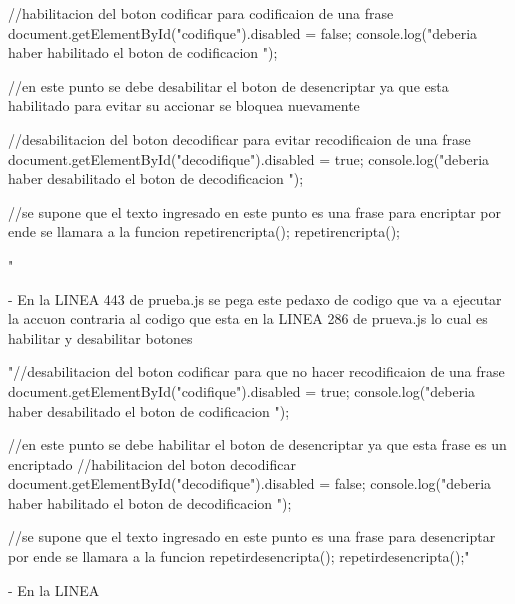 {{                                //habilitacion del boton codificar para codificaion de una frase 
                                document.getElementById("codifique").disabled = false;
                                console.log("deberia haber habilitado el boton de codificacion ");

                                //en este punto se debe desabilitar el boton de desencriptar ya que esta habilitado para evitar su accionar se bloquea nuevamente
                                
                                //desabilitacion del boton decodificar para evitar recodificaion de una frase 
                                document.getElementById("decodifique").disabled = true;
                                console.log("deberia haber desabilitado el boton de decodificacion ");  
                            
                            
                                //se supone que el texto ingresado en este punto es una frase para encriptar por ende se llamara a la funcion repetirencripta();
                                repetirencripta();
                            }
                        } "

            - En la LINEA 443 de prueba.js se pega este pedaxo de codigo que va a ejecutar la accuon contraria al codigo que esta en la LINEA 286 de prueva.js lo cual es habilitar y desabilitar botones 
                            
                                "//desabilitacion del boton codificar para que no hacer recodificaion de una frase 
                                document.getElementById("codifique").disabled = true;
                                console.log("deberia haber desabilitado el boton de codificacion ");

                                //en este punto se debe habilitar el boton de desencriptar ya que esta frase es un encriptado
                                //habilitacion del boton decodificar 
                                document.getElementById("decodifique").disabled = false;
                                console.log("deberia haber habilitado el boton de decodificacion ");  
                                    
                                //se supone que el texto ingresado en este punto es una frase para desencriptar por ende se llamara a la funcion repetirdesencripta();
                                repetirdesencripta();"

            - En la LINEA 
       
          